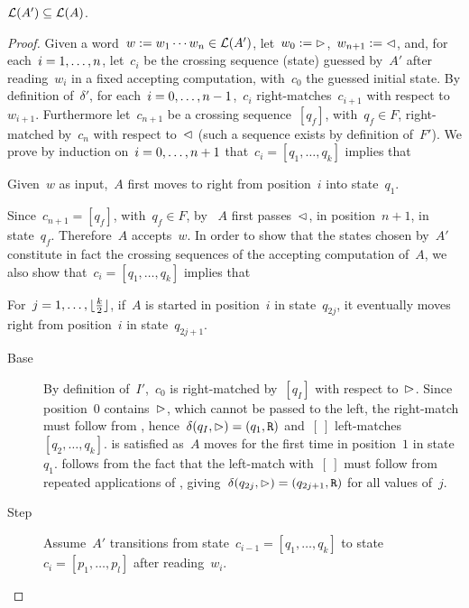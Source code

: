 \begin{lemm}\label{lem:2DFAto1NFA-2}
	$\mathcal L(A')\subseteq\mathcal L(A)$.
\end{lemm}
\begin{proof}
	Given a word~$w:=w_1\cdots w_n\in\mathcal L(A')$, let~$w_0:=\rhd$,~$w_{n+1}:=\lhd$, and, for each~$i=1,\dots,n$, let~$c_i$ be the crossing sequence (state) guessed by~$A'$ after reading~$w_i$ in a fixed accepting computation, with~$c_0$ the guessed initial state.
	By definition of~$\delta'$, for each~$i=0,\dots,n-1$,~$c_i$ right-matches~$c_{i+1}$ with respect to~$w_{i+1}$.
	Furthermore let~$c_{n+1}$ be a crossing sequence~$[q_f]$, with~$q_f\in F$, right-matched by~$c_n$ with respect to~$\lhd$ (such a sequence exists by definition of~$F'$).
	We prove by induction on~$i=0,\dots,n+1$ that~$c_i=[q_1,\dots,q_k]$ implies that
	\begin{statements}
		\item \label{lem:2DFAto1NFA-2-1} Given~$w$ as input,~$A$ first moves to right from position~$i$ into state~$q_1$.
	\end{statements}
	Since~$c_{n+1}=[q_f]$, with~$q_f\in F$, by ~$A$ first passes~$\lhd$, in position~$n+1$, in state~$q_f$. Therefore~$A$ accepts~$w$.
	In order to show that the states chosen by~$A'$ constitute in fact the crossing sequences of the accepting computation of~$A$, we also show that~$c_i=[q_1,\dots,q_k]$ implies that
	\begin{statements}[resume]
		\item \label{lem:2DFAto1NFA-2-2} For~$j=1,\dots,\lfloor \frac{k}{2} \rfloor$, if~$A$ is started in position~$i$ in state~$q_{2j}$, it eventually moves right from position~$i$ in state~$q_{2j+1}$.
	\end{statements}
	\begin{description}
		\item[Base] By definition of~$I'$,~$c_0$ is right-matched by~$[q_I]$ with respect to~$\rhd$. Since position~$0$ contains~$\rhd$, which cannot be passed to the left, the right-match must follow from , hence~$\delta(q_I,\rhd)=(q_1,\mathtt R)$ and~$[~]$ left-matches~$[q_2,\dots,q_k]$.
		       is satisfied as~$A$ moves for the first time in position~$1$ in state~$q_1$.
		       follows from the fact that the left-match with~$[~]$ must follow from repeated applications of , giving~$\delta(q_{2j},\rhd)=(q_{2j+1},\mathtt R)$ for all values of~$j$.
		\item[Step] Assume~$A'$ transitions from state~$c_{i-1}=[q_1,\dots,q_k]$ to state~$c_i=[p_1,\dots,p_l]$ after reading~$w_i$.

\end{description}
\end{proof}
